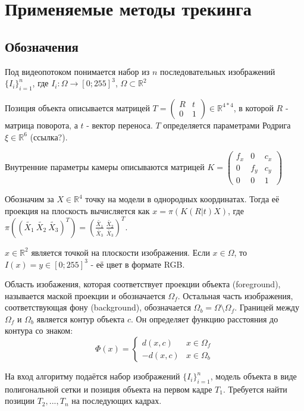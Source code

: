 \section{Применяемые методы трекинга}
\subsection{Обозначения}
Под видеопотоком понимается набор из $n$ последовательных изображений $\{I_i\}_{i = 1}^n$, где $I_i: \Omega \rightarrow [0; 255]^3$, $\Omega \subset \mathbb{R}^2$

Позиция объекта описывается матрицей  $T =
\begin{pmatrix}
  R& t\\
  0& 1
\end{pmatrix} \in \mathbb{R}^{4*4}$, в которой $R$ - матрица поворота, а $t$ - вектор переноса. $T$ определяется параметрами Родрига $\xi \in \mathbb{R}^6$ (ссылка?).

Внутренние параметры камеры описываются матрицей $K = 
\begin{pmatrix}
  f_x& 0& c_x\\
  0& f_y& c_y\\
  0& 0& 1
\end{pmatrix}$

Обозначим за $X \in \mathbb{R}^4$ точку на модели в однородных координатах. Тогда её проекция на плоскость вычисляется как $x = \pi(K(R | t) X)$, где $\pi(
(\tilde{X_1}\ \tilde{X_2}\ \tilde{X_3})^T
) = (\frac{\tilde{X_1}}{\tilde{X_3}} \ \frac{\tilde{X_2}}{\tilde{X_3}})^T$.

$x \in \mathbb{R}^2$ является точкой на плоскости изображения. Если $x \in \Omega$, то $I(x) = y \in [0; 255]^3$ - её цвет в формате RGB.

Область изобажения, которая соответствует проекции объекта (foreground), называется маской проекции и обозначается $\Omega_f$. Остальная часть изображения, соответствующая фону (background), обозначается $\Omega_b = \Omega \setminus \Omega_f$. Границей между $\Omega_f$ и $\Omega_b$ является контур объекта $c$. Он определяет функцию расстояния до контура со знаком: 
\begin{equation*}
\Phi(x) = 
 \begin{cases}
   d(x, c) &x \in \Omega_f\\
   -d(x, c) &x \in \Omega_b
 \end{cases}
\end{equation*}

На вход алгоритму подаётся набор изображений $\{I_i\}_{i = 1}^n$, модель объекта в виде полигональной сетки и позиция объекта на первом кадре $T_1$. Требуется найти позиции $T_2, ..., T_n$ на последующих кадрах.

